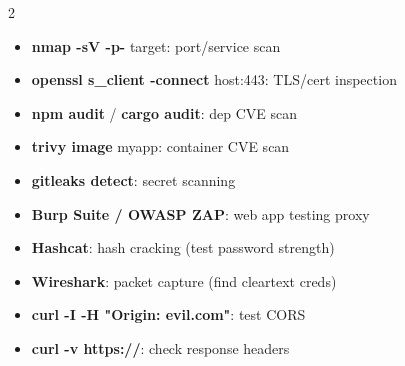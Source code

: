 \documentclass[11pt, letterpaper]{article}
\begin{document}
\begin{tcolorbox}[colback=part7bg, colframe=sectiongrey,
  title={\bfseries Security Tools at a Glance}, arc=3pt, boxrule=1pt]
\footnotesize
\begin{multicols}{2}
\begin{itemize}[noitemsep, leftmargin=*]
  \item \textbf{nmap -sV -p-} target: port/service scan
  \item \textbf{openssl s\_client -connect} host:443: TLS/cert inspection
  \item \textbf{npm audit} / \textbf{cargo audit}: dep CVE scan
  \item \textbf{trivy image} myapp: container CVE scan
  \item \textbf{gitleaks detect}: secret scanning
\end{itemize}
\columnbreak
\begin{itemize}[noitemsep, leftmargin=*]
  \item \textbf{Burp Suite / OWASP ZAP}: web app testing proxy
  \item \textbf{Hashcat}: hash cracking (test password strength)
  \item \textbf{Wireshark}: packet capture (find cleartext creds)
  \item \textbf{curl -I -H "Origin: evil.com"}: test CORS
  \item \textbf{curl -v https://}: check response headers
\end{itemize}
\end{multicols}
\end{tcolorbox}
\end{document}
